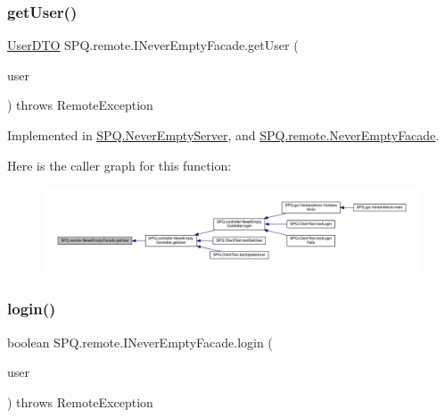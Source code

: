 \subsubsection{\texorpdfstring{get\+User()}{getUser()}}
{\footnotesize\ttfamily \mbox{\hyperlink{class_s_p_q_1_1dto_1_1_user_d_t_o}{User\+D\+TO}} S\+P\+Q.\+remote.\+I\+Never\+Empty\+Facade.\+get\+User (\begin{DoxyParamCaption}\item[{\mbox{\hyperlink{class_s_p_q_1_1dto_1_1_user_d_t_o}{User\+D\+TO}}}]{user }\end{DoxyParamCaption}) throws Remote\+Exception}



Implemented in \mbox{\hyperlink{class_s_p_q_1_1_never_empty_server_abb18bd0d72ecb8790068f206c592c58d}{S\+P\+Q.\+Never\+Empty\+Server}}, and \mbox{\hyperlink{class_s_p_q_1_1remote_1_1_never_empty_facade_a32679a25e12c8a33e84087de357cd616}{S\+P\+Q.\+remote.\+Never\+Empty\+Facade}}.

Here is the caller graph for this function\+:\nopagebreak
\begin{figure}[H]
\begin{center}
\leavevmode
\includegraphics[width=350pt]{interface_s_p_q_1_1remote_1_1_i_never_empty_facade_aa329dfc23ab0832e73802bf2df90b9e0_icgraph}
\end{center}
\end{figure}
\mbox{\label{interface_s_p_q_1_1remote_1_1_i_never_empty_facade_a2440fa36695c63e4e4c30fc25965f853}} 
\subsubsection{\texorpdfstring{login()}{login()}}
{\footnotesize\ttfamily boolean S\+P\+Q.\+remote.\+I\+Never\+Empty\+Facade.\+login (\begin{DoxyParamCaption}\item[{\mbox{\hyperlink{class_s_p_q_1_1dto_1_1_user_d_t_o}{User\+D\+TO}}}]{user }\end{DoxyParamCaption}) throws Remote\+Exception}




